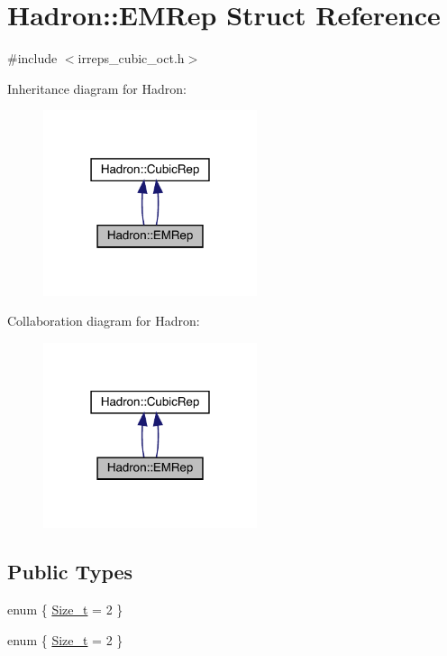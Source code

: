 \hypertarget{structHadron_1_1EMRep}{}\section{Hadron\+:\+:E\+M\+Rep Struct Reference}
\label{structHadron_1_1EMRep}


{\ttfamily \#include $<$irreps\+\_\+cubic\+\_\+oct.\+h$>$}



Inheritance diagram for Hadron\+:\nopagebreak
\begin{figure}[H]
\begin{center}
\leavevmode
\includegraphics[width=178pt]{d0/d94/structHadron_1_1EMRep__inherit__graph}
\end{center}
\end{figure}


Collaboration diagram for Hadron\+:\nopagebreak
\begin{figure}[H]
\begin{center}
\leavevmode
\includegraphics[width=178pt]{de/d21/structHadron_1_1EMRep__coll__graph}
\end{center}
\end{figure}
\subsection*{Public Types}
\begin{DoxyCompactItemize}
\item 
enum \{ \mbox{\hyperlink{structHadron_1_1EMRep_af34859174c0b8f5f070177b60d296a4da95cfc91bb6a89057579f519ca41a8015}{Size\+\_\+t}} = 2
 \}
\item 
enum \{ \mbox{\hyperlink{structHadron_1_1EMRep_af34859174c0b8f5f070177b60d296a4da95cfc91bb6a89057579f519ca41a8015}{Size\+\_\+t}} = 2
 \}
\end{DoxyCompactItemize}

